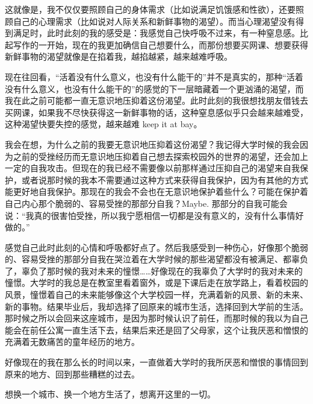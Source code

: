 这就像是，我不仅仅要照顾自己的身体需求（比如说满足饥饿感和性欲），还要照顾自己的心理需求（比如说对人际关系和新鲜事物的渴望）。而当心理渴望没有得到满足时，此时此刻的我的感受是：我感觉自己快呼吸不过来，有一种窒息感。比起写作的一开始，现在的我更加确信自己想要什么，而那份想要买网课、想要获得新鲜事物的渴望就像是在掐着我，越掐越紧，越来越难呼吸。

现在往回看，“活着没有什么意义，也没有什么能干的”并不是真实的，那种“活着没有什么意义，也没有什么能干的”的感觉的下一层暗藏着一个更汹涌的渴望，而我在此之前可能都一直无意识地压抑着这份渴望。此时此刻的我很想找朋友借钱去买网课，如果我不尽快获得这一新鲜事物的话，这种窒息感似乎只会越来越难受，这种渴望快要失控的感觉，越来越难 keep it at bay。

我会在想，为什么之前的我要无意识地压抑着这份渴望？我记得大学时候的我会因为之前的受挫经历而无意识地压抑着自己想去探索校园外的世界的渴望，还会加上一定的自我攻击。但现在的我已经不需要像以前那样通过压抑自己的渴望来自我保护，或者说那时候的我本不需要通过这种方式来获得自我保护，因为有其他的方式能更好地自我保护。那现在的我会不会也在无意识地保护着些什么？可能在保护着自己内心那个脆弱的、容易受挫的那部分自我？Maybe. 那部分的自我可能会说：“我真的很害怕受挫，所以我宁愿相信一切都是没有意义的，没有什么事情好做的。”

感觉自己此时此刻的心情和呼吸都好点了。然后我感受到一种伤心，好像那个脆弱的、容易受挫的那部分自我在哭泣着在大学时候的那些渴望都没有被满足、都辜负了，辜负了那时候的我对未来的憧憬……好像现在的我辜负了大学时的我对未来的憧憬。大学时的我总是在教室里看着窗外，或是下课后走在放学路上，看着校园的风景，憧憬着自己的未来能够像这个大学校园一样，充满着新的风景、新的未来、新的事物。结果毕业后，我却选择了回原来的城市生活，选择回到大学前的生活。那时候之所以会回来这座城市，是因为那时候认识了前任，而那时候的我以为自己能会在前任公寓一直生活下去，结果后来还是回了父母家，这个让我厌恶和憎恨的充满着无数痛苦的童年经历的地方。

好像现在的我在那么长的时间以来，一直做着大学时的我所厌恶和憎恨的事情\pozhehao{}回到原来的地方、回到那些糟糕的过去。

想换一个城市、换一个地方生活了，想离开这里的一切。

